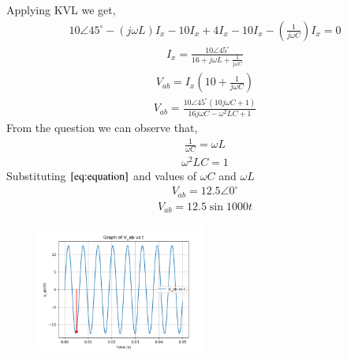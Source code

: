\documentclass[journal,12pt,twocolumn]{IEEEtran}
\theoremstyle{remark}
\begin{document}
Applying KVL we get,
\begin{align}
    10 \angle 45^\circ-(j\omega L)I_x-10I_x+4I_x-10I_x-(\frac{1}{j\omega C})I_x=0
\end{align}
\begin{align}
    I_x=\frac{10 \angle 45^\circ}{16+j\omega L+\frac{1}{j\omega C}}
\end{align}
\begin{align}
    V_{ab}=I_x(10+\frac{1}{j\omega C})
\end{align}
\begin{align}
    V_{ab}=\frac{10\angle 45^\circ(10j\omega C+1)}{16j\omega C-\omega^2LC+1}
    \end{align}
    From the question we can observe that,
    \begin{align}
        \frac{1}{\omega C}=\omega L
    \end{align}
    \begin{align}
        \omega^2LC=1 \label{eq:equation}
    \end{align}
Substituting $\ref{eq:equation}$ and values of $\omega C$ and $\omega L$ 
\begin{align}
    V_{ab}=12.5\angle 0^\circ
\end{align}
\begin{align}
    V_{ab}=12.5\sin{1000t}
\end{align}

\begin{figure}[H]
  \centering
  \includegraphics[width=0.5\textwidth]{figs/gate.png} %
  \label{fig:example}
\end{figure}
\end{document}
